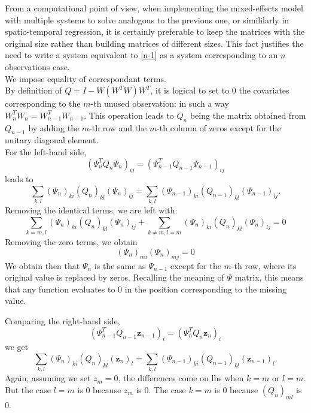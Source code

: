 From a computational point of view, when implementing the mixed-effects model
with multiple systems to solve analogous to the previous one, or simililarly in
spatio-temporal regression, it is certainly preferable to keep the matrices
with the original size rather than building matrices of different sizes. This
fact justifies the need to write a system equivalent to \ref{n-1} as a system
corresponding to an $n$ observations case.\\ We impose equality of
correspondant terms.\\ By definition of $Q=I-W \left( W^T W \right) W^T$, it is
logical to set to $0$ the covariates corresponding to the $m$-th unused
observation: in such a way $W^T_nW_n=W^T_{n-1}W_{n-1}$. This operation leads to
$Q_n$ being the matrix obtained from $Q_{n-1}$ by adding the $m$-th row and the
$m$-th column of zeros except for the unitary diagonal element.\\ For the
left-hand side,
\begin{equation}
	\left(\Psi^T_nQ_n\Psi_n\right)_{ij}=\left(\Psi_{n-1}^TQ_{n-1}\Psi_{n-1}\right)_{ij}
\end{equation}
leads to
\begin{equation}
	\sum_{k,l}\left(\Psi_n\right)_{ki}\left( Q_n \right)_{kl} \left( \Psi_n\right)_{lj}=
	\sum_{k,l}\left(\Psi_{n-1}\right)_{ki}\left( Q_{n-1} \right)_{kl} \left( \Psi_{n-1}\right)_{lj}.
\end{equation}
Removing the identical terms, we are left with:
\begin{equation}
	\sum_{k=m,l}\left(\Psi_n\right)_{ki}\left( Q_n \right)_{kl} \left( \Psi_n\right)_{lj}
	+
	\sum_{k \neq m,l=m}\left(\Psi_n\right)_{ki}\left( Q_n \right)_{kl} \left( \Psi_n\right)_{lj}
	=0
\end{equation}
Removing the zero terms, we obtain
\begin{equation}
	\left(\Psi_n\right)_{mi}\left( \Psi_n\right)_{mj}=0
\end{equation}
We obtain then that $\Psi_n$ is the same as $\Psi_{n-1}$ except for
the $m$-th row, where its original value is replaced by zeros. Recalling the
meaning of $\Psi$ matrix, this means that any function evaluates to $0$ in the
position corresponding to the missing value.

Comparing the right-hand side,
\begin{equation}
	\left( \Psi_{n-1}^T Q_{n-1}\bm{z}_{n-1}\right)_i =
	\left( \Psi_{n}^T Q_{n}\bm{z}_{n}\right)_i
\end{equation}
we get
\begin{equation}
	\sum_{k,l} \left( \Psi_{n}\right)_{ki} \left(  Q_{n} \right)_{kl} \left( \bm{z}_{n} \right)_l
	=
	\sum_{k,l} \left( \Psi_{n-1}\right)_{ki} \left(  Q_{n-1} \right)_{kl} \left( \bm{z}_{n-1} \right)_l .
\end{equation}
Again, assuming we set $z_m=0$, the differences come on lhs when
$k=m$ or $l=m$. But the case $l=m$ is 0 because $z_m$ is $0$. The case $k=m$ is
0 because $\left( Q_n\right)_{ml}$ is 0.

